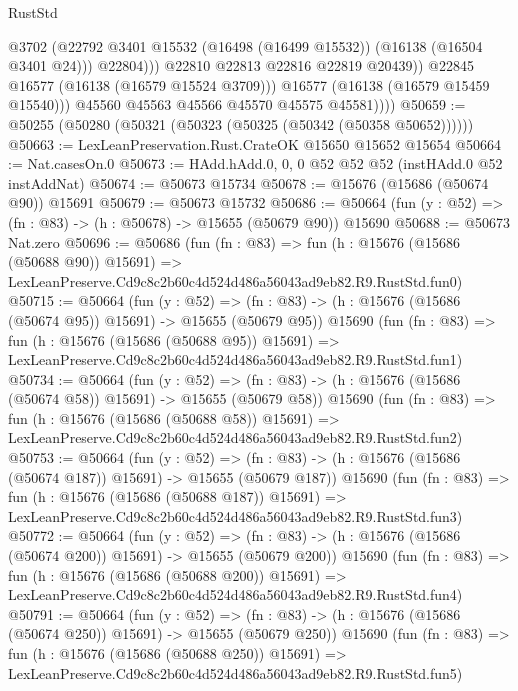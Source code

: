 \begin{lexlean}{RustStd}
\begin{coremodule}
                          @3702
                          (@22792 @3401 @15532 (@16498 (@16499 @15532)) (@16138 (@16504 @3401 @24)))
                          @22804)))
                    @22810
                    @22813
                    @22816
                    @22819
                    @20439))
                @22845
                @16577
                (@16138 (@16579 @15524 @3709)))
              @16577
              (@16138 (@16579 @15459 @15540)))
            @45560
            @45563
            @45566
            @45570
            @45575
            @45581))))
@50659 := @50255 (@50280 (@50321 (@50323 (@50325 (@50342 (@50358 @50652))))))
@50663 := LexLeanPreservation.Rust.CrateOK @15650 @15652 @15654
@50664 := Nat.casesOn.{0}
@50673 := HAdd.hAdd.{0, 0, 0} @52 @52 @52 (instHAdd.{0} @52 instAddNat)
@50674 := @50673 @15734
@50678 := @15676 (@15686 (@50674 @90)) @15691
@50679 := @50673 @15732
@50686 := @50664 (fun (y : @52) => (fn : @83) -> (h : @50678) -> @15655 (@50679 @90)) @15690
@50688 := @50673 Nat.zero
@50696 := @50686
    (fun (fn : @83) =>
    fun (h : @15676 (@15686 (@50688 @90)) @15691) =>
    LexLeanPreserve.Cd9c8c2b60c4d524d486a56043ad9eb82.R9.RustStd.fun0)
@50715 := @50664
    (fun (y : @52) =>
    (fn : @83) -> (h : @15676 (@15686 (@50674 @95)) @15691) -> @15655 (@50679 @95))
    @15690
    (fun (fn : @83) =>
    fun (h : @15676 (@15686 (@50688 @95)) @15691) =>
    LexLeanPreserve.Cd9c8c2b60c4d524d486a56043ad9eb82.R9.RustStd.fun1)
@50734 := @50664
    (fun (y : @52) =>
    (fn : @83) -> (h : @15676 (@15686 (@50674 @58)) @15691) -> @15655 (@50679 @58))
    @15690
    (fun (fn : @83) =>
    fun (h : @15676 (@15686 (@50688 @58)) @15691) =>
    LexLeanPreserve.Cd9c8c2b60c4d524d486a56043ad9eb82.R9.RustStd.fun2)
@50753 := @50664
    (fun (y : @52) =>
    (fn : @83) -> (h : @15676 (@15686 (@50674 @187)) @15691) -> @15655 (@50679 @187))
    @15690
    (fun (fn : @83) =>
    fun (h : @15676 (@15686 (@50688 @187)) @15691) =>
    LexLeanPreserve.Cd9c8c2b60c4d524d486a56043ad9eb82.R9.RustStd.fun3)
@50772 := @50664
    (fun (y : @52) =>
    (fn : @83) -> (h : @15676 (@15686 (@50674 @200)) @15691) -> @15655 (@50679 @200))
    @15690
    (fun (fn : @83) =>
    fun (h : @15676 (@15686 (@50688 @200)) @15691) =>
    LexLeanPreserve.Cd9c8c2b60c4d524d486a56043ad9eb82.R9.RustStd.fun4)
@50791 := @50664
    (fun (y : @52) =>
    (fn : @83) -> (h : @15676 (@15686 (@50674 @250)) @15691) -> @15655 (@50679 @250))
    @15690
    (fun (fn : @83) =>
    fun (h : @15676 (@15686 (@50688 @250)) @15691) =>
    LexLeanPreserve.Cd9c8c2b60c4d524d486a56043ad9eb82.R9.RustStd.fun5)

\end{coremodule}
\end{lexlean}
